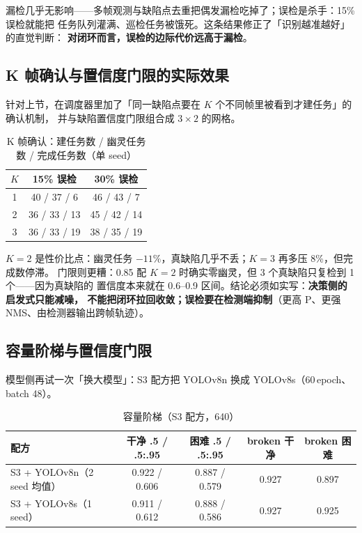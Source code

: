 \documentclass[UTF8,a4paper,11pt]{ctexart}
\begin{document}
漏检几乎无影响——多帧观测与缺陷点去重把偶发漏检吃掉了；误检是杀手：15\% 误检就能把
任务队列灌满、巡检任务被饿死。这条结果修正了「识别越准越好」的直觉判断：
\textbf{对闭环而言，误检的边际代价远高于漏检}。

\subsection{K 帧确认与置信度门限的实际效果}

针对上节，在调度器里加了「同一缺陷点要在 $K$ 个不同帧里被看到才建任务」的确认机制，
并与缺陷置信度门限组合成 $3\times2$ 的网格。

\begin{table}[htbp]
  \centering
  \caption{K 帧确认：建任务数 / 幽灵任务数 / 完成任务数（单 seed）}
  \label{tab:kframe}
  \begin{tabular}{ccc}
    \toprule
    $K$ & 15\% 误检 & 30\% 误检 \\
    \midrule
    1 & 40 / 37 / 6 & 46 / 43 / 7 \\
    2 & 36 / 33 / 13 & 45 / 42 / 14 \\
    3 & 36 / 33 / 19 & 38 / 35 / 19 \\
    \bottomrule
  \end{tabular}
\end{table}

$K=2$ 是性价比点：幽灵任务 $-11\%$，真缺陷几乎不丢；$K=3$ 再多压 8\%，但完成数停滞。
门限则更糟：0.85 配 $K=2$ 时确实零幽灵，但 3 个真缺陷只复检到 1 个——因为真缺陷的
置信度本来就在 0.6--0.9 区间。结论必须如实写：\textbf{决策侧的启发式只能减噪，
不能把闭环拉回收敛；误检要在检测端抑制}（更高 P、更强 NMS、由检测器输出跨帧轨迹）。

\subsection{容量阶梯与置信度门限}

模型侧再试一次「换大模型」：S3 配方把 YOLOv8n 换成 YOLOv8s（60\,epoch、batch 48）。

\begin{table}[htbp]
  \centering
  \small
  \setlength{\tabcolsep}{4pt}
  \caption{容量阶梯（S3 配方，640）}
  \label{tab:capacity}
  \begin{tabular}{lcccc}
    \toprule
    配方 & 干净 .5 / .5:.95 & 困难 .5 / .5:.95 & broken 干净 & broken 困难 \\
    \midrule
    S3 + YOLOv8n（2 seed 均值） & 0.922 / 0.606 & 0.887 / 0.579 & 0.927 & 0.897 \\
    S3 + YOLOv8s（1 seed）      & 0.911 / 0.612 & 0.888 / 0.586 & 0.927 & 0.925 \\
    \bottomrule
  \end{tabular}
\end{table}
\end{document}
